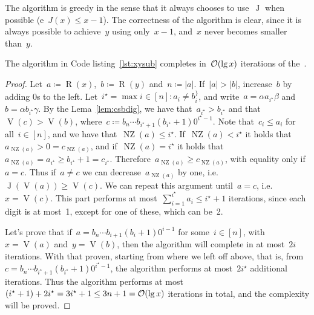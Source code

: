 \documentclass[main.tex]{subfiles}
\newcommand{\NZ}{\operatorname{NZ}}
\renewcommand{\V}{\operatorname{V}}
\newcommand{\R}{\operatorname{R}}
\newcommand{\J}{\operatorname{J}}
\begin{document}
The algorithm is greedy in the sense that it always chooses to use~$\J$ when possible (e~${J(x) \leq x - 1}$). The correctness of the algorithm is clear, since it is always possible to achieve~$y$ using only~$x-1$, and~$x$ never becomes smaller than~$y$.

\begin{theorem} \label{thm:xysub}
    The algorithm in Code listing~\ref{lst:xysub} completes in~$\mathcal{O}(\lg x)$ iterations of the~.
\end{theorem}
\begin{proof}

	Let~$a \coloneqq \R(x)$,~$b \coloneqq \R(y)$ and~$n \coloneqq |a|$. If~$|a| > |b|$, increase~$b$ by adding 0s to the left. Let~${i^\star = \max{i \in [n] : a_i \neq b_i^\}}}$, and write~${a = \alpha a_{i^\star} \beta}$ and~${b = \alpha b_{i^\star} \gamma}$. By the Lema~\ref{lem:csbdig}, we have that~$a_{i^\star} > b_{i^\star}$ and that~${\V(c) > \V(b)}$, where~${c \coloneqq b_n \cdots b_{i^\star + 1} (b_{i^\star} + 1) 0^{i^\star - 1}}$. Note that~$c_i \leq a_i$ for all~${i \in [n]}$, and we have that~${\NZ(a) \leq i^\star}$. If~${\NZ(a) < i^\star}$ it holds that~$a_{\NZ(a)} > 0 = c_{\NZ(a)}$, and if~$\NZ(a) = i^\star$ it holds that~${a_{\NZ(a)} = a_{i^\star} \geq b_{i^\star} + 1 = c_{i^\star}}$. Therefore~$a_{\NZ(a)} \geq c_{\NZ(a)}$, with equality only if~$a = c$. Thus if~$a \neq c$ we can decrease~$a_{\NZ(a)}$ by one, i.e.~$\J(\V(a)) \geq \V(c)$. We can repeat this argument until~$a = c$, i.e.~$x = \V(c)$. This part performs at most~${\sum\limits_{i = 1}^{i^\star}{a_i} \leq i^\star + 1}$ iterations, since each digit is at most~1, except for one of these, which can be~2.

	Let's prove that if~${a = b_n \cdots b_{i+1} (b_i + 1) 0^{i-1}}$ for some~$i \in [n]$, with~${x = \V(a)}$ and~${y = \V(b)}$, then the algorithm will complete in at most~$2i$ iterations. With that proven, starting from where we left off above, that is, from~${c = b_n \cdots b_{i^\star + 1} (b_{i^\star} + 1) 0^{i^\star - 1}}$, the algorithm performs at most~$2i^\star$ additional iterations. Thus the algorithm performs at most~${(i^\star + 1) + 2i^\star = 3i^\star + 1 \leq 3n+1 = \mathcal{O}(\lg x)}$ iterations in total, and the complexity will be proved.


\end{proof}
\end{document}

